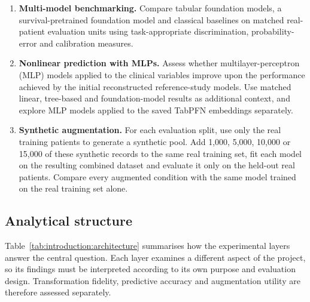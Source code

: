 \begin{enumerate}[label=\textbf{O\arabic*.},ref=O\arabic*]
\item \label{obj:foundation-models}\textbf{Multi-model benchmarking.}
Compare tabular foundation models, a survival-pretrained foundation model and
classical baselines on matched real-patient evaluation units using
task-appropriate discrimination, probability-error and calibration measures.

\item \label{obj:mlp}\textbf{Nonlinear prediction with MLPs.}
Assess whether multilayer-perceptron (MLP) models applied to the clinical
variables improve upon the performance achieved by the initial reconstructed
reference-study models. Use matched linear, tree-based and foundation-model
results as additional context, and explore MLP models applied to the saved TabPFN
embeddings separately.

\item \label{obj:augmentation}\textbf{Synthetic augmentation.}
For each evaluation split, use only the real training patients to generate a
synthetic pool. Add 1,000, 5,000, 10,000 or 15,000 of these synthetic records to
the same real training set, fit each model on the resulting combined dataset and
evaluate it only on the held-out real patients. Compare every augmented condition
with the same model trained on the real training set alone.
\end{enumerate}

\subsection{Analytical structure}
\label{sec:introduction:structure}

Table~\ref{tab:introduction:architecture} summarises how the experimental layers
answer the central question. Each layer examines a different aspect of the
project, so its findings must be interpreted according to its own purpose and
evaluation design. Transformation fidelity, predictive accuracy and augmentation
utility are therefore assessed separately.

